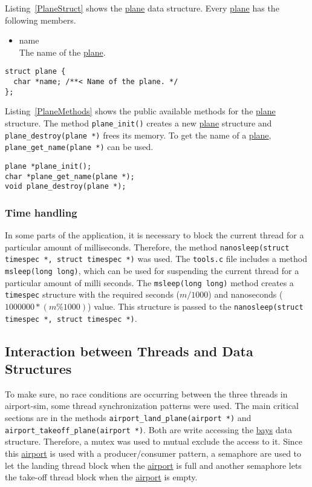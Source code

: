 \documentclass[a4paper, 12pt]{scrartcl} %
\begin{document}
\label{sec:plane}
Listing~\ref{PlaneStruct} shows the \hyperref[sec:plane]{plane} data structure.
Every \hyperref[sec:plane]{plane} has the following members.
\begin{itemize}
  \item{name} \\
    The name of the \hyperref[sec:plane]{plane}.
\end{itemize}
\begin{lstlisting}
struct plane {
  char *name; /**< Name of the plane. */
};
\end{lstlisting}
Listing~\ref{PlaneMethods} shows the public available methods for the \hyperref[sec:plane]{plane}
structure. The method \texttt{plane\_init()} creates a new \hyperref[sec:plane]{plane} structure and
\texttt{plane\_destroy(plane *)} frees its memory. To get the name of a \hyperref[sec:plane]{plane},
\texttt{plane\_get\_name(plane *)} can be used.
\begin{lstlisting}
plane *plane_init();
char *plane_get_name(plane *);
void plane_destroy(plane *);
\end{lstlisting}

\subsubsection{Time handling} In some parts of the application, it is necessary
to block the current thread for a particular amount of milliseconds. Therefore,
the method \texttt{nanosleep(struct timespec *, struct timespec *)} was used.
The \texttt{tools.c} file includes a method \texttt{msleep(long long)}, which
can be used for suspending the current thread for a particular amount of milli
seconds. The \texttt{msleep(long long)} method creates a \texttt{timespec}
structure with the required seconds ($m/1000$) and nanoseconds
($1000000*(m\%1000)$) value. This structure is passed to the
\texttt{nanosleep(struct timespec *, struct timespec *)}.

\subsection{Interaction between Threads and Data Structures}

To make sure, no race conditions are occurring between the three threads in
airport-sim, some thread synchronization patterns were used. The main critical
sections are in the methods \texttt{airport\_land\_plane(airport *)} and
\texttt{airport\_takeoff\_plane(airport *)}. Both are write accessing the
\hyperref[sec:bay]{bays} data structure. Therefore, a mutex was used to mutual
exclude the access to it.  Since this \hyperref[sec:airport]{airport} is used
with a producer/consumer pattern, a semaphore are used to let the landing
thread block when the \hyperref[sec:airport]{airport} is full and another
semaphore lets the take-off thread block when the
\hyperref[sec:airport]{airport} is empty. \\
\end{document}
